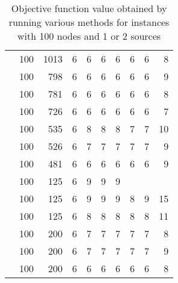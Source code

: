 \begin{table}[]
\begin{tabular}{rrrrrrrrrr}
                    & 100   & 1013  & 6  & 6       & 6       & 6       & 6       & 6       & 8  \\
                    & 100   & 798   & 6  & 6       & 6       & 6       & 6       & 6       & 9  \\
                    & 100   & 781   & 6  & 6       & 6       & 6       & 6       & 6       & 8  \\
                    & 100   & 726   & 6  & 6       & 6       & 6       & 6       & 6       & 7  \\
                    & 100   & 535   & 6  & 8       & 8       & 8       & 7       & 7       & 10 \\
                    & 100   & 526   & 6  & 7       & 7       & 7       & 7       & 7       & 9  \\
                    & 100   & 481   & 6  & 6       & 6       & 6       & 6       & 6       & 9  \\
                    & 100   & 125   & 6  & 9       & 9       & 9       &         &         &    \\
                    & 100   & 125   & 6  & 9       & 9       & 9       & 8       & 9       & 15 \\
                    & 100   & 125   & 6  & 8       & 8       & 8       & 8       & 8       & 11 \\
                    & 100   & 200   & 6  & 7       & 7       & 7       & 7       & 7       & 8  \\
                    & 100   & 200   & 6  & 7       & 7       & 7       & 7       & 7       & 9  \\
                    & 100   & 200   & 6  & 6       & 6       & 6       & 6       & 6       & 8 
\end{tabular}
\caption{Objective function value obtained by running various methods for instances with 100 nodes and 1 or 2 sources}
\label{tab:obj:100}
\end{table}


